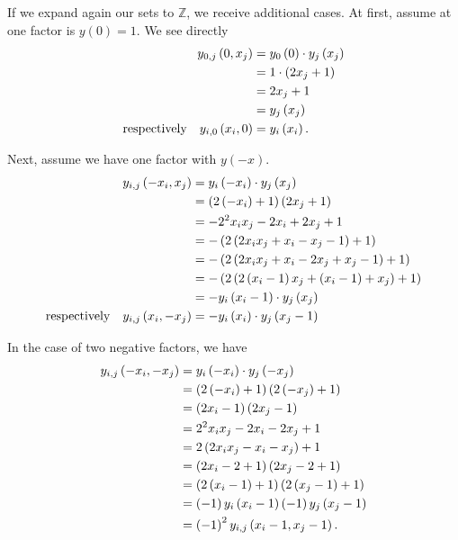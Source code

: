 If we expand again our sets to $\mathbb{Z}$, we receive additional cases. At first, assume at one factor is $y\left(0\right) = 1$. We see directly
\begin{alignat}{3}
	y_{0,j}\left(0,x_{j}\right) &= y_{0}\left(0\right) \cdot y_{j}\left(x_{j}\right) \notag \\
	&= 1 \cdot \left(2x_{j} + 1\right) \notag \\
	&= 2x_{j} + 1 \notag \\
	&= y_{j}\left(x_{j}\right) \\
	\mathrm{respectively} \quad y_{i,0}\left(x_{i},0\right) &= y_{i}\left(x_{i}\right).
\label{eq:onefactor1}
\end{alignat}

Next, assume we have one factor with $y\left(-x\right)$.
\begin{alignat}{3}
	y_{i,j}\left(-x_{i},x_{j}\right) & = y_{i}\left(-x_{i}\right) \cdot y_{j}\left(x_{j}\right) \notag \\
	&= \left(2\left(-x_{i}\right) + 1\right)\left(2x_{j} + 1\right) \notag \\
	&= -2^{2}x_{i}x_{j} - 2x_{i} + 2x_{j} + 1 \notag \\
	&= -\left(2\left(2x_{i}x_{j} + x_{i} - x_{j} - 1\right) + 1\right) \notag \\
	&= -\left(2\left(2x_{i}x_{j} + x_{i} - 2x_{j} + x_{j} -1\right) + 1\right) \notag \\
	&= -\left(2\left(2\left(x_{i} - 1\right)x_{j} + \left(x_{i} - 1\right) + x_{j}\right) + 1\right) \notag \\
	&= -y_{i}\left(x_{i} - 1\right) \cdot y_{j}\left(x_{j}\right) \\
	\mathrm{respectively} \quad y_{i,j}\left(x_{i},-x_{j}\right) &= -y_{i}\left(x_{i}\right) \cdot y_{j}\left(x_{j} - 1\right)
\label{eq:onefactorminus}
\end{alignat}

In the case of two negative factors, we have
\begin{alignat}{3}
	y_{i,j}\left(-x_{i},-x_{j}\right) &= y_{i}\left(-x_{i}\right) \cdot y_{j}\left(-x_{j}\right) \notag \\
	&= \left(2\left(-x_{i}\right) + 1\right)\left(2\left(-x_{j}\right) + 1\right) \notag \\
	&= \left(2x_{i} - 1\right)\left(2x_{j} - 1\right) \notag \\
	&= 2^{2}x_{i}x_{j} - 2x_{i} - 2x_{j} + 1 \notag \\
	&= 2\left(2x_{i}x_{j} - x_{i} - x_{j}\right) + 1 \notag \\
	&= \left(2x_{i} - 2 + 1\right)\left(2x_{j} - 2 + 1\right) \notag \\
	&= \left(2\left(x_{i} - 1\right) + 1\right)\left(2\left(x_{j} - 1\right) + 1\right) \notag \\
	&= \left(-1\right)y_{i}\left(x_{i} - 1\right)\left(-1\right)y_{j}\left(x_{j} - 1\right) \notag \\
	&= \left(-1\right)^{2}y_{i,j}\left(x_{i} - 1,x_{j} - 1\right).
\label{eq:twofactorminus}
\end{alignat}
